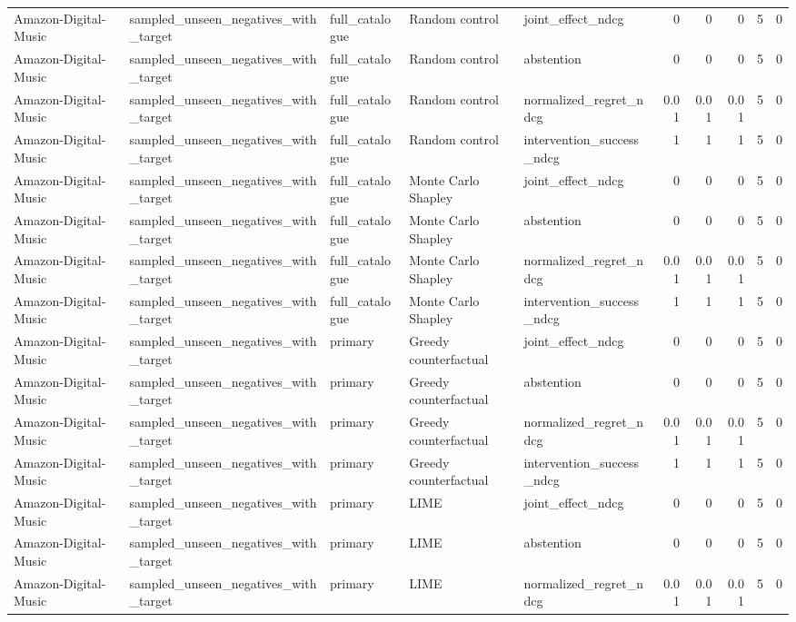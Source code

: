 \begin{table}[t]
{\begin{tabular}{lllllrrrrr}
Amazon-Digital-Music & sampled\_unseen\_negatives\_with\_target & full\_catalogue & Random control & joint\_effect\_ndcg & 0 & 0 & 0 & 5 & 0 \\
Amazon-Digital-Music & sampled\_unseen\_negatives\_with\_target & full\_catalogue & Random control & abstention & 0 & 0 & 0 & 5 & 0 \\
Amazon-Digital-Music & sampled\_unseen\_negatives\_with\_target & full\_catalogue & Random control & normalized\_regret\_ndcg & 0.01 & 0.01 & 0.01 & 5 & 0 \\
Amazon-Digital-Music & sampled\_unseen\_negatives\_with\_target & full\_catalogue & Random control & intervention\_success\_ndcg & 1 & 1 & 1 & 5 & 0 \\
Amazon-Digital-Music & sampled\_unseen\_negatives\_with\_target & full\_catalogue & Monte Carlo Shapley & joint\_effect\_ndcg & 0 & 0 & 0 & 5 & 0 \\
Amazon-Digital-Music & sampled\_unseen\_negatives\_with\_target & full\_catalogue & Monte Carlo Shapley & abstention & 0 & 0 & 0 & 5 & 0 \\
Amazon-Digital-Music & sampled\_unseen\_negatives\_with\_target & full\_catalogue & Monte Carlo Shapley & normalized\_regret\_ndcg & 0.01 & 0.01 & 0.01 & 5 & 0 \\
Amazon-Digital-Music & sampled\_unseen\_negatives\_with\_target & full\_catalogue & Monte Carlo Shapley & intervention\_success\_ndcg & 1 & 1 & 1 & 5 & 0 \\
Amazon-Digital-Music & sampled\_unseen\_negatives\_with\_target & primary & Greedy counterfactual & joint\_effect\_ndcg & 0 & 0 & 0 & 5 & 0 \\
Amazon-Digital-Music & sampled\_unseen\_negatives\_with\_target & primary & Greedy counterfactual & abstention & 0 & 0 & 0 & 5 & 0 \\
Amazon-Digital-Music & sampled\_unseen\_negatives\_with\_target & primary & Greedy counterfactual & normalized\_regret\_ndcg & 0.01 & 0.01 & 0.01 & 5 & 0 \\
Amazon-Digital-Music & sampled\_unseen\_negatives\_with\_target & primary & Greedy counterfactual & intervention\_success\_ndcg & 1 & 1 & 1 & 5 & 0 \\
Amazon-Digital-Music & sampled\_unseen\_negatives\_with\_target & primary & LIME & joint\_effect\_ndcg & 0 & 0 & 0 & 5 & 0 \\
Amazon-Digital-Music & sampled\_unseen\_negatives\_with\_target & primary & LIME & abstention & 0 & 0 & 0 & 5 & 0 \\
Amazon-Digital-Music & sampled\_unseen\_negatives\_with\_target & primary & LIME & normalized\_regret\_ndcg & 0.01 & 0.01 & 0.01 & 5 & 0 \\

\end{tabular}}
\end{table}
